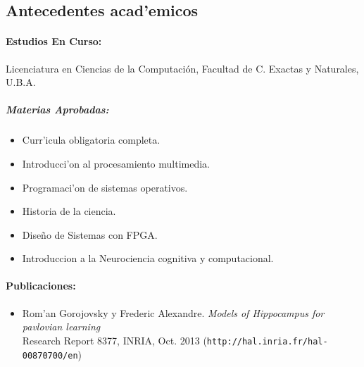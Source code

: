 \subsection*{Antecedentes acad'emicos}
\paragraph{Estudios En Curso:}
Licenciatura en Ciencias de la Computaci\'{o}n, Facultad de C. Exactas y Naturales, U.B.A.
\subparagraph{Materias Aprobadas:}
\begin{itemize} 
	\item Curr'icula obligatoria completa.
	\item Introducci'on al procesamiento multimedia.
	\item Programaci'on de sistemas operativos.
	\item Historia de la ciencia.
	\item Diseño de Sistemas con FPGA.
	\item Introduccion a la Neurociencia cognitiva y computacional.
\end{itemize}

\paragraph{Publicaciones:}
\begin{itemize}
	\item Rom'an Gorojovsky y Frederic Alexandre. \emph{Models of Hippocampus for pavlovian learning}\\
		Research Report 8377, INRIA, Oct. 2013 (\texttt{http://hal.inria.fr/hal-00870700/en})
\end{itemize}

